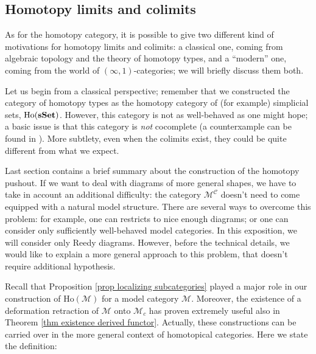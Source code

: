 \begin{refsection}
\section{Homotopy limits and colimits} \label{homotopy limits}

As for the homotopy category, it is possible to give two different kind of motivations for homotopy limits and colimits: a classical one, coming from algebraic topology and the theory of homotopy types, and a ``modern'' one, coming from the world of $(\infty,1)$-categories; we will briefly discuss them both.

Let us begin from a classical perspective; remember that we constructed the category of homotopy types as the homotopy category of (for example) simplicial sets, $\mathrm{Ho}(\mathbf{s\,\!\mathbf{Set}})$. However, this category is not as well-behaved as one might hope; a basic issue is that this category is \emph{not} cocomplete (a counterxample can be found in \cite[Example 6.3.3]{riehl}). More subtlety, even when the colimits exist, they could be quite different from what we expect.

\begin{eg}

\end{eg}














Last section contains a brief summary about the construction of the homotopy pushout. If we want to deal with diagrams of more general shapes, we have to take in account an additional difficulty: the category $\mathcal M^{\mathcal C}$ doesn't need to come equipped with a natural model structure. There are several ways to overcome this problem: for example, one can restricts to nice enough diagrams; or one can consider only sufficiently well-behaved model categories. In this exposition, we will consider only Reedy diagrams. However, before the technical details, we would like to explain a more general approach to this problem, that doesn't require additional hypothesis.

Recall that Proposition \ref{prop localizing subcategories} played a major role in our construction of $\mathrm{Ho}(\mathcal M)$ for a model category $\mathcal M$. Moreover, the existence of a deformation retraction of $\mathcal M$ onto $\mathcal M_c$ has proven extremely useful also in Theorem \ref{thm existence derived functor}. Actually, these constructions can be carried over in the more general context of homotopical categories. Here we state the definition:


\end{refsection}
